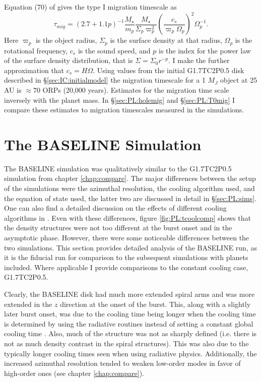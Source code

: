 Equation (70) of \citet{tanaka2002} gives the type I migration timescale as  
\begin{equation}\label{eq:PL:t1mig}
\tau_{mig} = \left ( 2.7 + 1.1 p \right)^{-1} \frac{M_\star}{m_p}\frac{M_\star}{\Sigma_p \varpi_p^2}\left( \frac{c_s}{\varpi_p \Omega_p} \right )^2 \Omega_p^{-1}.
\end{equation}
Here $\varpi_p$ is the object radius, $\Sigma_p$ is the surface density at that radius, $\Omega_p$ is the rotational frequency, $c_s$ is the sound speed, and $p$ is the index for the power law of the surface density distribution, that is $\Sigma = \Sigma_0 r^{-p}$. I make the further approximation that $c_s = H \Omega$. Using values from the initial G1.7TC2P0.5 disk described in \S\ref{sec:IC:initialmodel} the migration timescale for a 1 $M_J$ object at 25 AU is $\approx 70$ ORPs (20,000 years). Estimates for the migration time scale inversely with the planet mass. In \S\ref{sec:PL:holemig} and \S\ref{sec:PL:T0mig} I compare these estimates to migration timescales measured in the simulations.

\section{The BASELINE Simulation}\label{sec:PL:baseline}

The BASELINE simulation was qualitatively similar to the G1.7TC2P0.5 simulation from chapter \ref{chap:compare}. The major differences between the setup of the simulations were the azimuthal resolution, the cooling algorithm used, and the equation of state used, the latter two are discussed in detail in \S\ref{sec:PL:sims}. One can also find a detailed discussion on the effects of different cooling algorithms in \citet{boley2006}. Even with these differences, figure \ref{fig:PL:tcoolcomp} shows that the density structures were not too different at the burst onset and in the asymptotic phase. However, there were some noticeable differences between the two simulations. This section provides detailed analysis of the BASELINE run, as it is the fiducial run for comparison to the subsequent simulations with planets included. Where applicable I provide comparisons to the constant cooling case, G1.7TC2P0.5.

Clearly, the BASELINE disk had much more extended spiral arms and was more extended in the $z$ direction at the onset of the burst. This, along with a slightly later burst onset, was due to the cooling time being longer when the cooling time is determined by using the radiative routines instead of setting a constant global cooling time \citep{boley2006}. Also, much of the structure was not as sharply defined (i.e. there is not as much density contrast in the spiral structures). This was also due to the typically longer cooling times seen when using radiative physics. Additionally, the increased azimuthal resolution tended to weaken low-order modes in favor of high-order ones (see chapter \ref{chap:compare}). 

